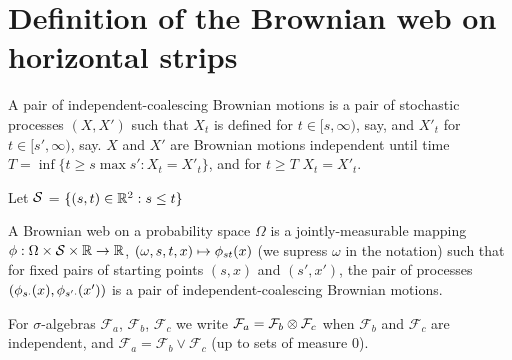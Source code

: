 {
\section{Definition of the Brownian web on horizontal strips}

\begin{definition}
  \label{def:independent-coalescing-bm}
  A pair of independent-coalescing Brownian motions is a pair of
  stochastic processes $(X, X')$ such that $X_t$ is defined for $t \in
  [s, \infty)$, say, and $X'_t$ for $t \in [s', \infty)$, say.  $X$
      and $X'$ are Brownian motions independent until time $T = \inf
      \{ t \ge s \max s' : X_t = X'_t\}$, and for $t \ge T$ $X_t =
      X'_t$.
\end{definition}

\begin{notation}
  Let $\mathcal{S}$ = $\{(s, t) \in \mathbb{R}^2 : s \le t\}$
\end{notation}

\begin{definition}
  A Brownian web on a probability space $\Omega$ is a
  jointly-measurable mapping $\phi : \Omega \times \mathcal{S} \times
  \mathbb{R} \to \mathbb{R}$, $(\omega, s, t, x) \mapsto \phi_{{s}{t}}(x)$ (we supress
  $\omega$ in the notation) such that for fixed pairs of starting
  points $(s, x)$ and $(s', x')$, the pair of processes $(\phi_{{s}{\cdot}}(x), \phi_{{s'}{\cdot}}(x'))$ is a pair of independent-coalescing
  Brownian motions.
\end{definition}

\begin{notation}
  \newcommand{\F}{\mathcal{F}}

  For $\sigma$-algebras $\F_a$, $\F_b$, $\F_c$ we write $\F_a = \F_b
  \tensor \F_c$ when $\F_b$ and $\F_c$ are independent, and $\F_a =
  \F_b \vee \F_c$ (up to sets of measure $0$).
\end{notation}

}
